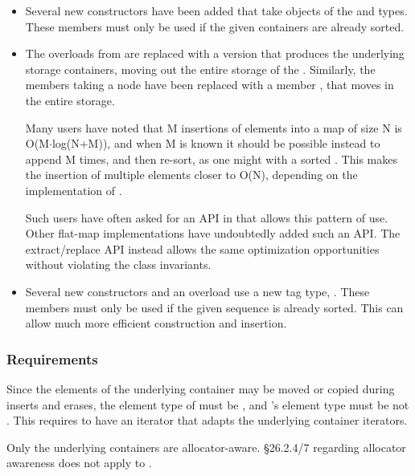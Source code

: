 \begin{itemize}
  \item Several new constructors have been added that take objects of the
     and  types.  These members must
    only be used if the given containers are already sorted.

  \item The  overloads from  are replaced with a
    version that produces the underlying storage containers, moving out the
    entire storage of the .  Similarly, the 
    members taking a node have been replaced with a member , that moves in the entire
    storage.

    Many users have noted that M insertions of elements into a map of size N
    is O(M$\cdot$log(N+M)), and when M is known it should be possible instead
    to append M times, and then re-sort, as one might with a sorted
    .  This makes the insertion of multiple elements closer to
    O(N), depending on the implementation of .

    Such users have often asked for an API in
     that allows this pattern of use.  Other
    flat-map implementations have undoubtedly added such an API.  The
    extract/replace API instead allows the same optimization opportunities
    without violating the class invariants.

  \item Several new constructors and an  overload use a new tag
    type, .  These members must only be used
    if the given sequence is already sorted.  This can allow much more
    efficient construction and insertion.
\end{itemize}

\subsubsection{ Requirements}

Since the elements of the underlying container may be moved or copied during
inserts and erases, the element type of  must be
, and 's element type must be not .
This requires  to have an iterator that adapts the underlying
container iterators.

Only the underlying containers are allocator-aware.  \S26.2.4/7 regarding
allocator awareness does not apply to .

